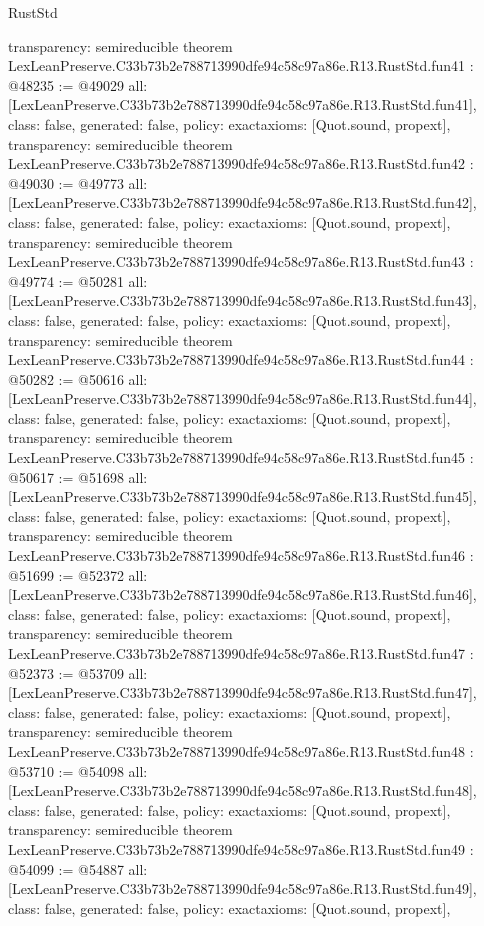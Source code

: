 \begin{lexlean}{RustStd}
\begin{coremodule}
{  transparency: semireducible
}
theorem LexLeanPreserve.C33b73b2e788713990dfe94c58c97a86e.R13.RustStd.fun41 : @48235 := @49029 {
  all: [LexLeanPreserve.C33b73b2e788713990dfe94c58c97a86e.R13.RustStd.fun41],
  class: false,
  generated: false,
  policy: exact{axioms: [Quot.sound, propext]},
  transparency: semireducible
}
theorem LexLeanPreserve.C33b73b2e788713990dfe94c58c97a86e.R13.RustStd.fun42 : @49030 := @49773 {
  all: [LexLeanPreserve.C33b73b2e788713990dfe94c58c97a86e.R13.RustStd.fun42],
  class: false,
  generated: false,
  policy: exact{axioms: [Quot.sound, propext]},
  transparency: semireducible
}
theorem LexLeanPreserve.C33b73b2e788713990dfe94c58c97a86e.R13.RustStd.fun43 : @49774 := @50281 {
  all: [LexLeanPreserve.C33b73b2e788713990dfe94c58c97a86e.R13.RustStd.fun43],
  class: false,
  generated: false,
  policy: exact{axioms: [Quot.sound, propext]},
  transparency: semireducible
}
theorem LexLeanPreserve.C33b73b2e788713990dfe94c58c97a86e.R13.RustStd.fun44 : @50282 := @50616 {
  all: [LexLeanPreserve.C33b73b2e788713990dfe94c58c97a86e.R13.RustStd.fun44],
  class: false,
  generated: false,
  policy: exact{axioms: [Quot.sound, propext]},
  transparency: semireducible
}
theorem LexLeanPreserve.C33b73b2e788713990dfe94c58c97a86e.R13.RustStd.fun45 : @50617 := @51698 {
  all: [LexLeanPreserve.C33b73b2e788713990dfe94c58c97a86e.R13.RustStd.fun45],
  class: false,
  generated: false,
  policy: exact{axioms: [Quot.sound, propext]},
  transparency: semireducible
}
theorem LexLeanPreserve.C33b73b2e788713990dfe94c58c97a86e.R13.RustStd.fun46 : @51699 := @52372 {
  all: [LexLeanPreserve.C33b73b2e788713990dfe94c58c97a86e.R13.RustStd.fun46],
  class: false,
  generated: false,
  policy: exact{axioms: [Quot.sound, propext]},
  transparency: semireducible
}
theorem LexLeanPreserve.C33b73b2e788713990dfe94c58c97a86e.R13.RustStd.fun47 : @52373 := @53709 {
  all: [LexLeanPreserve.C33b73b2e788713990dfe94c58c97a86e.R13.RustStd.fun47],
  class: false,
  generated: false,
  policy: exact{axioms: [Quot.sound, propext]},
  transparency: semireducible
}
theorem LexLeanPreserve.C33b73b2e788713990dfe94c58c97a86e.R13.RustStd.fun48 : @53710 := @54098 {
  all: [LexLeanPreserve.C33b73b2e788713990dfe94c58c97a86e.R13.RustStd.fun48],
  class: false,
  generated: false,
  policy: exact{axioms: [Quot.sound, propext]},
  transparency: semireducible
}
theorem LexLeanPreserve.C33b73b2e788713990dfe94c58c97a86e.R13.RustStd.fun49 : @54099 := @54887 {
  all: [LexLeanPreserve.C33b73b2e788713990dfe94c58c97a86e.R13.RustStd.fun49],
  class: false,
  generated: false,
  policy: exact{axioms: [Quot.sound, propext]},
}
\end{coremodule}
\end{lexlean}
